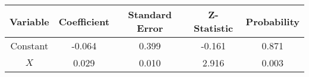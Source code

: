 \begin{tabular}{|c|c|c|c|c|}
\hline
Variable & Coefficient & Standard Error & Z-Statistic & Probability \\
\hline
Constant & -0.064 & 0.399 & -0.161 & 0.871 \\
$X$ & 0.029 & 0.010 & 2.916 & 0.003 \\
\hline
\end{tabular}